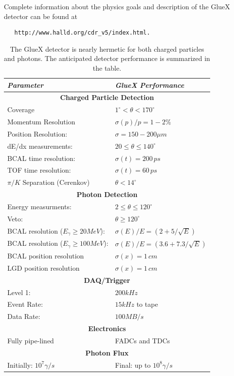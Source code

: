 \bigskip
Complete information about the physics goals and description of the GlueX detector
can be found at
\begin{verbatim} 
   http://www.halld.org/cdr_v5/index.html.
\end{verbatim}


\begin{table}[t]
\begin{center}
\begin{tabular}{ll}
\hline\hline
{\centering \textbf{\textit{Parameter}}} & 
{\centering \textbf{\textit{GlueX Performance}}} \\
\hline
\multicolumn{2}{c}{\textbf{Charged Particle Detection}} \\
Coverage              & $1^{\circ} < \theta < 170^{\circ}$  \\
Momentum Resolution   & $\sigma(p)/p=1-2\%$ \\    
Position Resolution:  & $\sigma=150-200\mu m$ \\
dE/dx measurements:   & $20\le \theta \le 140^{\circ}$ \\
BCAL time resolution: & $\sigma(t)=200\, ps$ \\
TOF time resolution:  & $\sigma(t)=60\, ps$ \\
$\pi/K$ Separation (Cerenkov) & $\theta < 14^{\circ}$ \\
\multicolumn{2}{c}{\textbf{Photon Detection}} \\
Energy measurments:   & $2\le \theta \le 120^{\circ}$ \\
Veto:                 & $\theta \geq 120^{\circ}$ \\
BCAL resolution ($E_{\gamma}\geq 20 MeV$):  & $\sigma(E)/E=(2+5/\sqrt{E})$ \\
BCAL resolution ($E_{\gamma}\geq 100 MeV$): & $\sigma(E)/E=(3.6+7.3/\sqrt{E})$ \\
BCAL  position resolution & $\sigma(x)=1\, cm$ \\
LGD  position resolution & $\sigma(x)=1\, cm$ \\
\multicolumn{2}{c}{\textbf{DAQ/Trigger}} \\
Level 1:     & $200 kHz$ \\
Event Rate: & $15 kHz$ to tape \\
Data Rate:   & $100 MB/s$ \\
\multicolumn{2}{c}{\textbf{Electronics}} \\
Fully pipe-lined &  FADCs and TDCs \\
\multicolumn{2}{c}{\textbf{Photon Flux}} \\
Initially: $10^{7} \gamma/s$ & Final: up to $10^{8}\gamma/s$ \\
\hline\hline
\end{tabular}
\caption[]{\label{tab:gluex_det}The GlueX detector is
nearly hermetic for both charged particles and photons. The anticipated 
detector performance is summarized in the table.}
\end{center}
\end{table}



